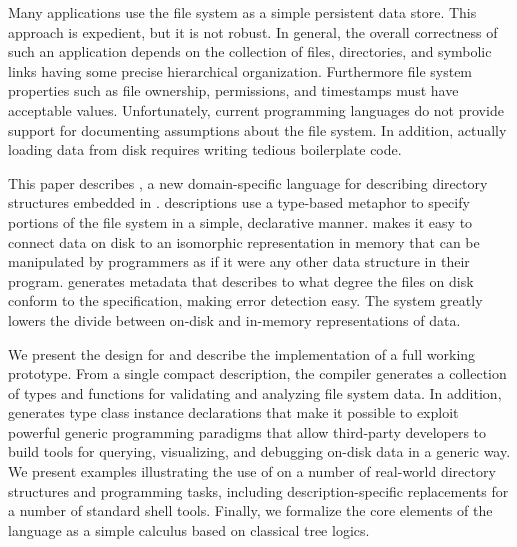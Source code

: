 Many applications use the file system as a simple persistent data
store.  This approach is expedient, but it is not robust.  In general,
the overall correctness of such an application depends on the
collection of files, directories, and symbolic links having some
precise hierarchical organization. Furthermore file system properties
such as file ownership, permissions, and timestamps must have
acceptable values. Unfortunately, current programming languages do not
provide support for documenting assumptions about the file system. In
addition, actually loading data from disk requires writing tedious
boilerplate code.

This paper describes \forest{}, a new domain-specific language for
describing directory structures embedded in \haskell{}. \forest{}
descriptions use a type-based metaphor to specify portions of the file
system in a simple, declarative manner.  \forest{} makes it easy to
connect data on disk to an isomorphic representation in memory
that can be manipulated by programmers as if it were any other
data structure in their program.  \forest{} generates
metadata that describes to what degree the files on disk conform to
the specification, making error detection easy. The system greatly
lowers the divide between on-disk and in-memory representations of data.

We present the design for \forest{} and describe the implementation of
a full working prototype. From a single compact description, the
\forest{} compiler generates a collection of \haskell{} types and
functions for validating and analyzing file system data.  In addition,
\forest{} generates type class instance declarations that make it
possible to exploit powerful generic programming paradigms that allow
third-party developers to build tools for querying, visualizing, and
debugging on-disk data in a generic way. We present examples
illustrating the use of \forest{} on a number of real-world directory
structures and programming tasks, including description-specific
replacements for a number of standard shell tools. Finally, we
formalize the core elements of the language as a simple calculus based
on classical tree logics.